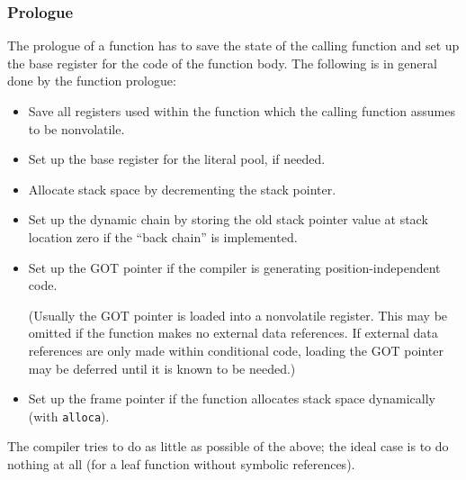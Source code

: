 \documentclass[english,11pt,twoside,toc=bib,toc=idx]{scrreprt}
\begin{document}
\subsubsection{Prologue}
The prologue of a function has to save the state of the calling
function and set up the base register for the code of the function
body.  The following is in general done by the function
prologue:
\begin{itemize}
\item Save all registers used within the function which the calling
  function assumes to be nonvolatile.
\item Set up the base register for the literal pool, if needed.
\item Allocate stack space by decrementing the stack pointer.
\item Set up the dynamic chain by storing the old stack pointer value
  at stack location zero if the ``back chain'' is implemented.
\item Set up the GOT pointer if the compiler is generating
  position-independent code.

  (Usually the GOT pointer is loaded into a nonvolatile register.  This
  may be omitted if the function makes no external data references.  If
  external data references are only made within conditional code, loading
  the GOT pointer may be deferred until it is known to be needed.)
\item Set up the frame pointer if the function allocates stack space
  dynamically (with \texttt{alloca}).
\end{itemize}

The compiler tries to do as little as possible of the above; the ideal
case is to do nothing at all (for a leaf function without symbolic
references).
\end{document}
